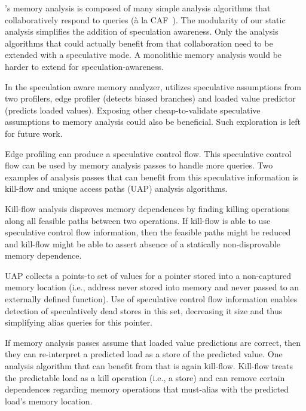 \name's memory analysis is composed of many simple analysis algorithms
that collaboratively respond to queries (\`{a} la
CAF~\cite{johnson:cgo:17}). 
%
The modularity of our static analysis simplifies the addition of
speculation awareness.  Only the analysis algorithms that could
actually benefit from that collaboration need to be extended with a
speculative mode.
%
A monolithic memory analysis would be harder to extend for
speculation-awareness.

In the speculation aware memory analyzer, \name utilizes speculative
assumptions from two profilers, edge profiler (detects biased
branches) and loaded value predictor (predicts loaded values).
%
Exposing other cheap-to-validate speculative assumptions to memory
analysis could also be beneficial.  Such exploration is left for
future work. 

Edge profiling can produce a speculative control flow. This
speculative control flow can be used by memory analysis passes to
handle more queries.
%
Two examples of analysis passes that can benefit from this speculative
information is kill-flow and unique access paths (UAP) analysis
algorithms.  

Kill-flow analysis disproves memory dependences by finding killing
operations along all feasible paths between two operations. If
kill-flow is able to use speculative control flow information, then
the feasible paths might be reduced and kill-flow might be able to
assert absence of a statically non-disprovable memory dependence.

UAP collects a points-to set of values for a pointer stored into a
non-captured memory location (i.e., address never stored into memory
and never passed to an externally defined function). 
Use of speculative control flow information enables detection of
speculatively dead stores in this set, decreasing it size and thus
simplifying alias queries for this pointer.


If memory analysis passes assume that loaded value predictions are
correct, then they can re-interpret a predicted load as a store of the
predicted value. One analysis algorithm that can benefit from that is
again kill-flow. Kill-flow treats the predictable load as a kill
operation (i.e., a store) and can remove certain dependences regarding
memory operations that must-alias with the predicted load's memory
location.


